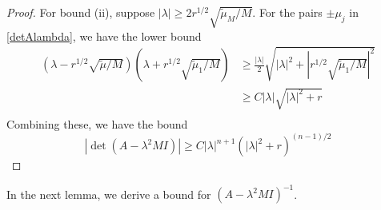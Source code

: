 \documentclass[thesis.tex]{subfiles}
\begin{document}
\begin{lemma}
\begin{proof}
For bound (ii), suppose $|\lambda| \geq 2 r^{1/2} \sqrt{\tilde{\mu}_M/M}$. For the pairs $\pm \mu_j$ in \eqref{detAlambda}, we have the lower bound
\begin{align*}
(\lambda - r^{1/2} \sqrt{\tilde{\mu}/M} )(\lambda + r^{1/2} \sqrt{\tilde{\mu}_1/M} )
&\geq \frac{|\lambda|}{2} \sqrt{ |\lambda|^2 + |r^{1/2} \sqrt{\tilde{\mu}_1/M}|^2 } \\
&\geq C |\lambda| \sqrt{ |\lambda|^2 + r } \\
\end{align*}
Combining these, we have the bound
\[
|\det(A - \lambda^2 M I)|
\geq C |\lambda|^{n+1} \left( |\lambda|^2 + r \right)^{(n-1)/2}
\]
\end{proof}
\end{lemma}

In the next lemma, we derive a bound for $(A - \lambda^2 M I)^{-1}$.
\end{document}
